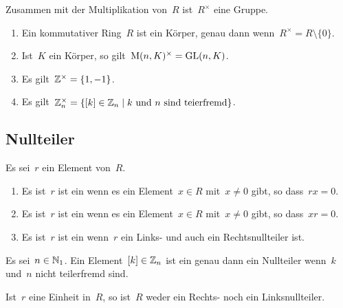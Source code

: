 \begin{proposition}
  Zusammen mit der Multiplikation von~$R$ ist~$R^\times$ eine Gruppe.
\end{proposition}

\begin{example}
  \leavevmode
  \begin{enumerate}
    \item
      Ein kommutativer Ring~$R$ ist ein Körper, genau dann wenn~$R^\times = R \setminus \{ 0 \}$.
    \item
      Ist~$K$ ein Körper, so gilt~$\operatorname{M}(n, K)^\times = \operatorname{GL}(n,K)$.
    \item
      Es gilt~$\mathbb{Z}^\times = \{1, -1\}$.
    \item
      Es gilt~$\Integer_n^\times = \{ \class{k} \in \Integer_n \suchthat \text{$k$ und~$n$ sind teierfremd} \}$.
  \end{enumerate}
\end{example}



\subsection{Nullteiler}

\begin{definition}
  Es sei~$r$ ein Element von~$R$.
  \begin{enumerate}
    \item
      Es ist~$r$ ist ein  wenn es ein Element~$x \in R$ mit~$x \neq 0$ gibt, so dass~$rx = 0$.
    \item
      Es ist~$r$ ist ein  wenn es ein Element~$x \in R$ mit~$x \neq 0$ gibt, so dass~$xr = 0$.
    \item
      Es ist~$r$ ist ein  wenn~$r$ ein Links- und auch ein Rechtsnullteiler ist.
  \end{enumerate}
\end{definition}

\begin{example}
  Es sei~$n \in \mathbb{N}_1$.
  Ein Element~$[k] \in \mathbb{Z}_n$ ist ein genau dann ein Nullteiler wenn~$k$ und~$n$ nicht teilerfremd sind.
\end{example}

\begin{proposition}
  Ist~$r$ eine Einheit in~$R$, so ist~$R$ weder ein Rechts- noch ein Linksnullteiler.
\end{proposition}

